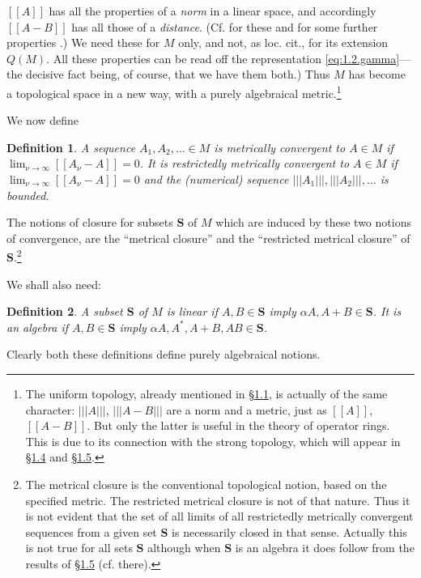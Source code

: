 \documentclass[b5paper,twoside]{article}
\newcommand{\secref}[2]{\hyperref[#1]{\mbox{\S#2}}}
\theoremstyle{mvnplain}
\newtheorem{definition}{Definition}[section]
\newcommand{\M}{\mathbf M}
\newcommand{\Metric}[1]{\left[\!\left[#1\right]\!\right]}
\newcommand{\OpNorm}[1]{\left\lvert\left\lvert\left\lvert#1\right\rvert\right\rvert\right\rvert}
\def\M{M}%
\def\Metric#1{[[#1]]}%
\begin{document}
$\Metric{A}$ has all the properties of a \emph{norm} in a linear space, and
accordingly $\Metric{A-B}$ has all those of a \emph{distance}.  (Cf. for these
and for some further properties \cite[p.~242, Property~II\textsuperscript{o}]{ref6}.)
We need these for $\M$ only, and not, as loc. cit., for its extension $Q(\M)$.
All these properties can be read off the representation
\eqref{eq:1.2.gamma}---the decisive fact being, of course, that we have them
both.)  Thus $\M$ has become a topological space in a new way, with a purely
algebraical metric.\footnote{The uniform topology, already mentioned in
\secref{sec:1.1}{1.1}, is actually of the same character: $\OpNorm{A}$,
$\OpNorm{A-B}$ are a norm and a metric, just as $\Metric{A}$,
$\Metric{A-B}$.  But only the latter is useful in the theory of operator rings.
This is due to its connection with the strong topology, which will appear in
\secref{sec:1.4}{1.4} and \secref{sec:1.5}{1.5}.}

We now define
\begin{definition}\label{def:1.2.1}
A sequence $A_1,A_2,\ldots\in\M$ is metrically convergent to $A\in\M$ if
$\lim_{\nu\to\infty}\Metric{A_\nu-A}=0$.  It is restrictedly metrically
convergent to $A\in\M$ if $\lim_{\nu\to\infty}\Metric{A_\nu-A}=0$ and the
(numerical) sequence $\OpNorm{A_1},\OpNorm{A_2},\ldots$ is bounded.
\end{definition}

The notions of closure for subsets $\mathbf S$ of $\M$ which are induced by
these two notions of convergence, are the ``metrical closure'' and the
``restricted metrical closure'' of $\mathbf S$.\footnote{The metrical closure is
the conventional topological notion, based on the specified metric.  The
restricted metrical closure is not of that nature.  Thus it is not evident that
the set of all limits of all restrictedly metrically convergent sequences from a
given set $\mathbf S$ is necessarily closed in that sense.  Actually this is not
true for all sets $\mathbf S$ although when $\mathbf S$ is an algebra it does
follow from the results of \secref{sec:1.5}{1.5} (cf. there).}

We shall also need:
\begin{definition}\label{def:1.2.2}
A subset $\mathbf S$ of $\M$ is linear if $A,B\in\mathbf S$ imply
$\alpha A,A+B\in\mathbf S$.  It is an algebra if $A,B\in\mathbf S$ imply
$\alpha A,A^*,A+B,AB\in\mathbf S$.
\end{definition}
Clearly both these definitions define purely algebraical notions.
\end{document}
